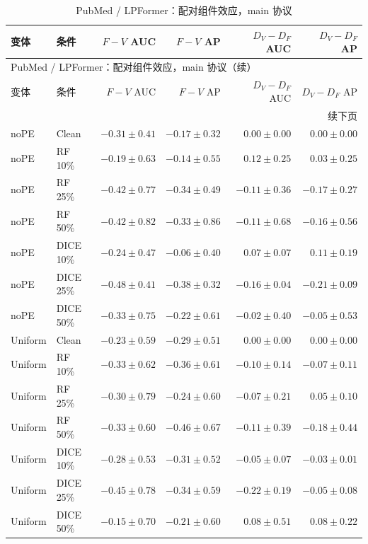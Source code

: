 {\footnotesize
\setlength{\tabcolsep}{3.2pt}
\renewcommand{\arraystretch}{1.10}
\begin{longtable}{llrrrr}
\caption{PubMed / LPFormer：配对组件效应，main 协议}\\
\toprule
变体 & 条件 & $F-V$ AUC & $F-V$ AP & $D_V-D_F$ AUC & $D_V-D_F$ AP \\
\midrule
\endfirsthead
\multicolumn{6}{l}{PubMed / LPFormer：配对组件效应，main 协议（续）}\\
\toprule
变体 & 条件 & $F-V$ AUC & $F-V$ AP & $D_V-D_F$ AUC & $D_V-D_F$ AP \\
\midrule
\endhead
\midrule\multicolumn{6}{r}{续下页}\\
\endfoot
\bottomrule
\endlastfoot
noPE & Clean & $-0.31\pm0.41$ & $-0.17\pm0.32$ & $0.00\pm0.00$ & $0.00\pm0.00$ \\
noPE & RF 10\% & $-0.19\pm0.63$ & $-0.14\pm0.55$ & $0.12\pm0.25$ & $0.03\pm0.25$ \\
noPE & RF 25\% & $-0.42\pm0.77$ & $-0.34\pm0.49$ & $-0.11\pm0.36$ & $-0.17\pm0.27$ \\
noPE & RF 50\% & $-0.42\pm0.82$ & $-0.33\pm0.86$ & $-0.11\pm0.68$ & $-0.16\pm0.56$ \\
noPE & DICE 10\% & $-0.24\pm0.47$ & $-0.06\pm0.40$ & $0.07\pm0.07$ & $0.11\pm0.19$ \\
noPE & DICE 25\% & $-0.48\pm0.41$ & $-0.38\pm0.32$ & $-0.16\pm0.04$ & $-0.21\pm0.09$ \\
noPE & DICE 50\% & $-0.33\pm0.75$ & $-0.22\pm0.61$ & $-0.02\pm0.40$ & $-0.05\pm0.53$ \\
Uniform & Clean & $-0.23\pm0.59$ & $-0.29\pm0.51$ & $0.00\pm0.00$ & $0.00\pm0.00$ \\
Uniform & RF 10\% & $-0.33\pm0.62$ & $-0.36\pm0.61$ & $-0.10\pm0.14$ & $-0.07\pm0.11$ \\
Uniform & RF 25\% & $-0.30\pm0.79$ & $-0.24\pm0.60$ & $-0.07\pm0.21$ & $0.05\pm0.10$ \\
Uniform & RF 50\% & $-0.33\pm0.60$ & $-0.46\pm0.67$ & $-0.11\pm0.39$ & $-0.18\pm0.44$ \\
Uniform & DICE 10\% & $-0.28\pm0.53$ & $-0.31\pm0.52$ & $-0.05\pm0.07$ & $-0.03\pm0.01$ \\
Uniform & DICE 25\% & $-0.45\pm0.78$ & $-0.34\pm0.59$ & $-0.22\pm0.19$ & $-0.05\pm0.08$ \\
Uniform & DICE 50\% & $-0.15\pm0.70$ & $-0.21\pm0.60$ & $0.08\pm0.51$ & $0.08\pm0.22$ \\
\end{longtable}
}

